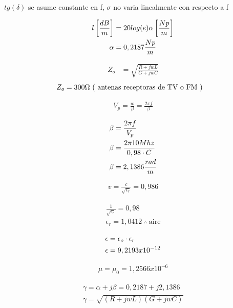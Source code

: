     $tg (\delta)$ se asume constante en f, $\sigma$ no varia linealmente con respecto a f

\begin{align}
    l \left[ \frac{dB}{m} \right] &= 20 log (e) \alpha \left[ \frac{Np}{m} \right] \\
    \alpha &= 0,2187 \frac{Np}{m} \notag
\end{align}    

\begin{align}
    Z_o &= \sqrt{ \frac{ R + jwL }  { G + jwC } }
    \label{ec 1}
\end{align}
\begin{align}
    Z_o &= 300 \Omega \   \text{( antenas receptoras de TV o FM )}   \notag
\end{align}


\begin{align}
    V_p = \frac{w}{\beta} = \frac{2 \pi f}{ \beta }
\end{align}

\begin{align}
    \beta &= \frac{ 2 \pi f } { V_p } \\
    \beta &= \frac{ 2 \pi 10Mhz } { 0,98 \cdot C } \notag \\
    \beta &= 2,1386 \frac{rad}{m} \notag
\end{align}

\begin{align*}
    v = \frac{c}{\sqrt{\epsilon_r}} = 0,986
\end{align*}

\begin{align*}
    \frac{1}{\sqrt{\epsilon_r}} = 0,98\\
    \epsilon_r = 1,0412 \  \therefore \ \text{aire}
\end{align*}

\begin{align}
    \epsilon &= \epsilon_o \cdot \epsilon_r \\
    \epsilon &= 9,2193x10^{-12} \notag
\end{align}

\begin{align*}
    \mu = \mu_0 = 1,2566x10^{-6}
\end{align*}

\begin{align}
    \gamma = \alpha + j\beta = 0,2187 + j2,1386 \\
    \gamma = \sqrt{ (R + jwL) (G + jwC) }
    \label{ec 2}
\end{align}

